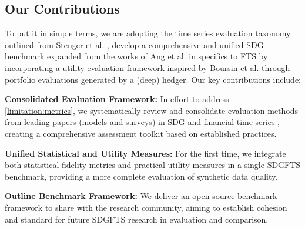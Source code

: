 \documentclass[sigconf]{acmart}
\begin{document}
  \subsection{Our Contributions}
  To put it in simple terms, we are adopting the time series evaluation
  taxonomy outlined from Stenger et al. \cite{Stenger24}, develop a
  comprehensive and unified SDG benchmark expanded from the works of
  Ang et al. \cite{Ang23} in specifics to FTS by incorporating a utility
  evaluation framework inspired by Boursin et al. \cite{Boursin22} through
  portfolio evaluations generated by a (deep) hedger.
  Our key contributions include:
  \begin{enumerate}[label=\textbf{[C\arabic*]}]
    \item \label{contribute:1} \textbf{Consolidated Evaluation
      Framework:}
      In effort to address \ref{limitation:metrics}, we systematically
      review and consolidate evaluation methods from leading papers
      (models and surveys) in SDG and financial time series
      \cite{Stenger24, Ang23, Boursin22}, creating a comprehensive
      assessment toolkit based on established practices.

    \item \label{contribute:2} \textbf{Unified Statistical and
      Utility Measures:}
      For the first time, we integrate both statistical fidelity metrics
      and practical utility measures in a single SDGFTS benchmark,
      providing a more complete evaluation of synthetic data quality.

    \item \label{contribute:3} \textbf{Outline Benchmark Framework:}
      We deliver an open-source benchmark framework to share with the
      research community, aiming to establish cohesion and standard for
      future SDGFTS research in evaluation and comparison.
  \end{enumerate}
\end{document}
